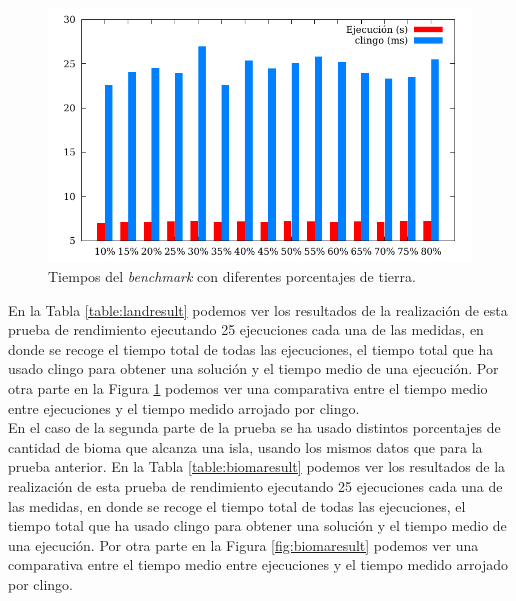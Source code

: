 \begin{figure}[!h]
	\centering
	\includegraphics[width=.8\textwidth]{tables/land-size.pdf}
	\caption{Tiempos del \textit{benchmark} con diferentes porcentajes de tierra.}\label{fig:landresult}
\end{figure}

En la Tabla \ref{table:landresult} podemos ver los resultados de la realización de esta prueba de rendimiento ejecutando 25 ejecuciones cada una de las medidas, en donde se recoge el tiempo total de todas las ejecuciones, el tiempo total que ha usado clingo para obtener una solución y el tiempo medio de una ejecución. Por otra parte en la Figura \ref{fig:landresult} podemos ver una comparativa entre el tiempo medio entre ejecuciones y el tiempo medido arrojado por clingo. \\

En el caso de la segunda parte de la prueba se ha usado distintos porcentajes de cantidad de bioma que alcanza una isla, usando los mismos datos que para la prueba anterior. En la Tabla \ref{table:biomaresult} podemos ver los resultados de la realización de esta prueba de rendimiento ejecutando 25 ejecuciones cada una de las medidas, en donde se recoge el tiempo total de todas las ejecuciones, el tiempo total que ha usado clingo para obtener una solución y el tiempo medio de una ejecución. Por otra parte en la Figura \ref{fig:biomaresult} podemos ver una comparativa entre el tiempo medio entre ejecuciones y el tiempo medido arrojado por clingo. \\

